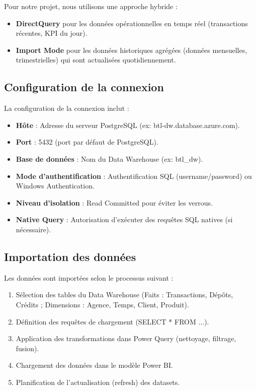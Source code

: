 Pour notre projet, nous utilisons une approche hybride :

\begin{itemize}
    \item \textbf{DirectQuery} pour les données opérationnelles en temps réel (transactions récentes, KPI du jour).
    \item \textbf{Import Mode} pour les données historiques agrégées (données mensuelles, trimestrielles) qui sont actualisées quotidiennement.
\end{itemize}

\subsection{Configuration de la connexion}

La configuration de la connexion inclut :

\begin{itemize}
    \item \textbf{Hôte} : Adresse du serveur PostgreSQL (ex: btl-dw.database.azure.com).
    \item \textbf{Port} : 5432 (port par défaut de PostgreSQL).
    \item \textbf{Base de données} : Nom du Data Warehouse (ex: btl\_dw).
    \item \textbf{Mode d'authentification} : Authentification SQL (username/password) ou Windows Authentication.
    \item \textbf{Niveau d'isolation} : Read Committed pour éviter les verrous.
    \item \textbf{Native Query} : Autorisation d'exécuter des requêtes SQL natives (si nécessaire).
\end{itemize}

\subsection{Importation des données}

Les données sont importées selon le processus suivant :

\begin{enumerate}
    \item Sélection des tables du Data Warehouse (Faits : Transactions, Dépôts, Crédits ; Dimensions : Agence, Temps, Client, Produit).
    \item Définition des requêtes de chargement (SELECT * FROM ...).
    \item Application des transformations dans Power Query (nettoyage, filtrage, fusion).
    \item Chargement des données dans le modèle Power BI.
    \item Planification de l'actualisation (refresh) des datasets.
\end{enumerate}

